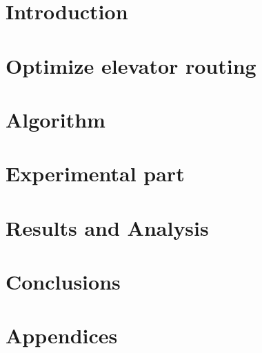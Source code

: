 \documentclass{scrartcl}
\title{\reportname}
\subtitle{An Evolutionary approach to elevator time optimization}
\author{Oskar Sundberg \and Linus Savinainen \and Samuel Wallander Leyonberg \and Gustav Pråmell \and Joel Scarinius Stävmo}
\date{\today}
\begin{document}
\maketitle

\newpage

\tableofcontents

\newpage

\section{Introduction}
\label{sec:intro}


\newpage

\section{Optimize elevator routing}
\label{sec:problem_description}


\newpage

\section{Algorithm}
\label{sec:algorithm}


\newpage

\section{Experimental part}
\label{sec:experimentation}


\newpage

\section{Results and Analysis}
\label{sec:results-analysis}


\newpage

\section{Conclusions}
\label{sec:conclusions}


\newpage

\appendix
\section{Appendices}
\label{sec:appendices}


\newpage



\end{document}
